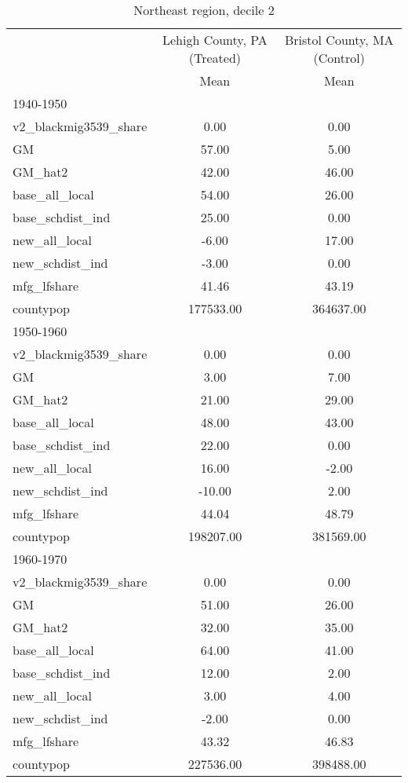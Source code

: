 \begin{table}[htbp]\centering
\def\sym#1{\ifmmode^{#1}\else\(^{#1}\)\fi}
\caption{Northeast region, decile 2 \label{tab1}}
\begin{tabular}{l*{2}{c}}
\toprule
                    &\multicolumn{1}{c}{Lehigh County, PA (Treated)}&\multicolumn{1}{c}{Bristol County, MA (Control)}\\
                    &        Mean&        Mean\\
\midrule
1940-1950           &            &            \\
v2\_blackmig3539\_share&        0.00&        0.00\\
GM                  &       57.00&        5.00\\
GM\_hat2             &       42.00&       46.00\\
base\_all\_local      &       54.00&       26.00\\
base\_schdist\_ind    &       25.00&        0.00\\
new\_all\_local       &       -6.00&       17.00\\
new\_schdist\_ind     &       -3.00&        0.00\\
mfg\_lfshare         &       41.46&       43.19\\
countypop           &   177533.00&   364637.00\\
\midrule
1950-1960           &            &            \\
v2\_blackmig3539\_share&        0.00&        0.00\\
GM                  &        3.00&        7.00\\
GM\_hat2             &       21.00&       29.00\\
base\_all\_local      &       48.00&       43.00\\
base\_schdist\_ind    &       22.00&        0.00\\
new\_all\_local       &       16.00&       -2.00\\
new\_schdist\_ind     &      -10.00&        2.00\\
mfg\_lfshare         &       44.04&       48.79\\
countypop           &   198207.00&   381569.00\\
\midrule
1960-1970           &            &            \\
v2\_blackmig3539\_share&        0.00&        0.00\\
GM                  &       51.00&       26.00\\
GM\_hat2             &       32.00&       35.00\\
base\_all\_local      &       64.00&       41.00\\
base\_schdist\_ind    &       12.00&        2.00\\
new\_all\_local       &        3.00&        4.00\\
new\_schdist\_ind     &       -2.00&        0.00\\
mfg\_lfshare         &       43.32&       46.83\\
countypop           &   227536.00&   398488.00\\
\bottomrule
\end{tabular}
\end{table}
